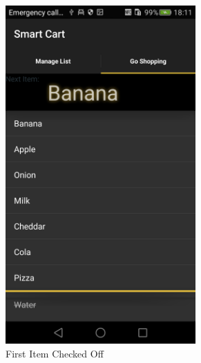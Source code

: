\begin{figure}[h]
\captionsetup{justification=centering}
\begin{subfigure}{0.475\textwidth} 
\includegraphics[width=0.8\textwidth, height=
0.35\textheight]{res/usermanual/firstItemChecked.png}
\caption{First Item Checked Off}
\label{fig:firstItemChecked}
\end{subfigure} \hspace{0.2\textwidth}
\begin{subfigure}{0.475\textwidth}

\end{subfigure}
\end{figure}
